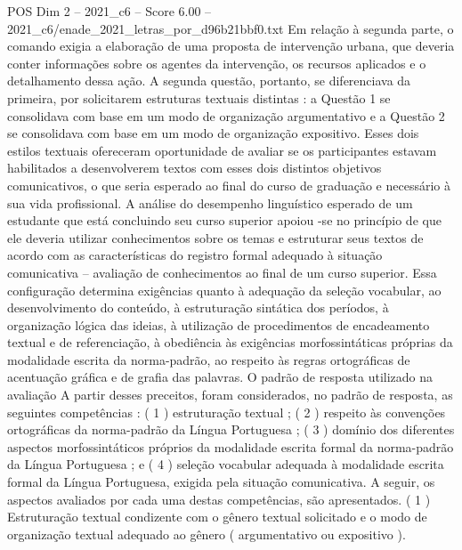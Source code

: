 \begin{textsample}{POS Dim 2 – 2021\_c6 – Score 6.00 – 2021\_c6/enade\_2021\_letras\_por\_d96b21bbf0.txt}
Em relação à segunda parte, o comando exigia a elaboração de uma proposta de intervenção urbana, que deveria conter informações sobre os agentes da intervenção, os recursos aplicados e o detalhamento dessa ação.
A segunda questão, portanto, se diferenciava da primeira, por solicitarem estruturas textuais distintas : a Questão 1 se consolidava com base em um modo de organização argumentativo e a Questão 2 se consolidava com base em um modo de organização expositivo.
Esses dois estilos textuais ofereceram oportunidade de avaliar se os participantes estavam habilitados a desenvolverem textos com esses dois distintos objetivos comunicativos, o que seria esperado ao final do curso de graduação e necessário à sua vida profissional.
A análise do desempenho linguístico esperado de um estudante que está concluindo seu curso superior apoiou -se no princípio de que ele deveria utilizar conhecimentos sobre os temas e estruturar seus textos de acordo com as características do registro formal adequado à situação comunicativa – avaliação de conhecimentos ao final de um curso superior.
Essa configuração determina exigências quanto à adequação da seleção vocabular, ao desenvolvimento do conteúdo, à estruturação sintática dos períodos, à organização lógica das ideias, à utilização de procedimentos de encadeamento textual e de referenciação, à obediência às exigências morfossintáticas próprias da modalidade escrita da norma-padrão, ao respeito às regras ortográficas de acentuação gráfica e de grafia das palavras.
O padrão de resposta utilizado na avaliação A partir desses preceitos, foram considerados, no padrão de resposta, as seguintes competências : ( 1 ) estruturação textual ; ( 2 ) respeito às convenções ortográficas da norma-padrão da Língua Portuguesa ; ( 3 ) domínio dos diferentes aspectos morfossintáticos próprios da modalidade escrita formal da norma-padrão da Língua Portuguesa ; e ( 4 ) seleção vocabular adequada à modalidade escrita formal da Língua Portuguesa, exigida pela situação comunicativa.
A seguir, os aspectos avaliados por cada uma destas competências, são apresentados. ( 1 ) Estruturação textual condizente com o gênero textual solicitado e o modo de organização textual adequado ao gênero ( argumentativo ou expositivo ).

\end{textsample}

